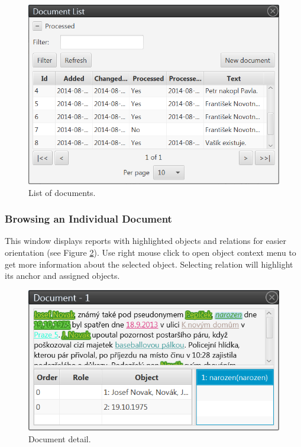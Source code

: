 \begin{figure}[!htb]
        \centering
        \includegraphics[width=\textwidth]{Images/documentlist}
        \caption{List of documents.}
        \label{fig:DocumentList}
\end{figure}

\subsubsection{Browsing an Individual Document}
\label{sssec:DocumentView}

This window displays reports with highlighted objects and relations for easier
orientation (see Figure \ref{fig:DocumentView}). Use right mouse click to open
object context menu to get more information about the selected object. Selecting
relation will highlight its anchor and assigned objects.

\begin{figure}[!htb]
        \centering
        \includegraphics[width=\textwidth]{Images/documentview}
        \caption{Document detail.}
        \label{fig:DocumentView}
\end{figure}

